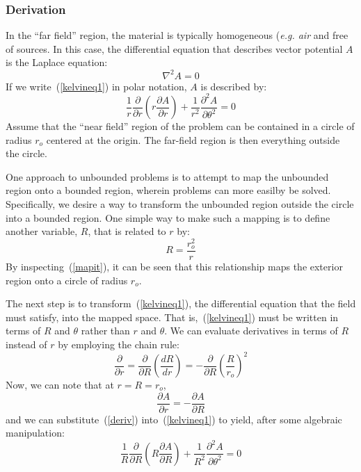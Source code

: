 \documentclass[12pt]{report}
\begin{document}
\subsubsection{Derivation}

In the ``far field'' region, the material is typically homogeneous
({\em e.g. air} and free of sources.  In this case, the
differential equation that describes vector potential $A$ is the
Laplace equation:
\begin{equation} \label{kelvineq1}
\nabla^2 A = 0
\end{equation}
If we write~(\ref{kelvineq1}) in polar notation, $A$ is described by:
\begin{equation}
\frac{1}{r} \frac{\partial}{\partial r} \left( r \frac{\partial
A}{\partial r} \right) + \frac{1}{r^2} \frac{\partial^2 A}{\partial
\theta^2} = 0
\end{equation}
Assume that the ``near field'' region of the problem can be
contained in a circle of radius $r_o$ centered at the origin.  The
far-field region is then everything outside the circle.

One approach to unbounded problems is to attempt to map the
unbounded region onto a bounded region, wherein problems can more
easilby be solved.  Specifically, we desire a way to transform the
unbounded region outside the circle into a bounded region.  One
simple way to make such a mapping is to define another variable,
$R$, that is related to $r$ by:
\begin{equation} \label{mapit}
R = \frac{r_o^2}{r}
\end{equation}
By inspecting~(\ref{mapit}), it can be seen that this relationship
maps the exterior region onto a circle of radius $r_o$.


The next step is to transform~(\ref{kelvineq1}), the differential
equation that the field must satisfy, into the mapped space. That
is,~(\ref{kelvineq1}) must be written in terms of $R$ and $\theta$ rather
than $r$ and $\theta$.  We can evaluate derivatives in terms of $R$
instead of $r$ by employing the chain rule:
\begin{equation} \label{deriv}
\frac{\partial}{\partial r} = \frac{\partial}{\partial R} \left(
\frac{d R}{d r} \right) = -\frac{\partial}{\partial R} \left(
\frac{R}{r_o} \right)^2
\end{equation}
Now, we can note that at $r=R=r_o$,
\begin{equation} \label{derivbc}
\frac{\partial A}{\partial r} = -\frac{\partial A}{\partial R}
\end{equation}
and we can substitute~(\ref{deriv}) into~(\ref{kelvineq1}) to yield,
after some algebraic manipulation:
\begin{equation} \label{kelvineq2}
\frac{1}{R} \frac{\partial}{\partial R} \left( R \frac{\partial
A}{\partial R} \right) + \frac{1}{R^2} \frac{\partial^2 A}{\partial
\theta^2} = 0
\end{equation}
\end{document}
